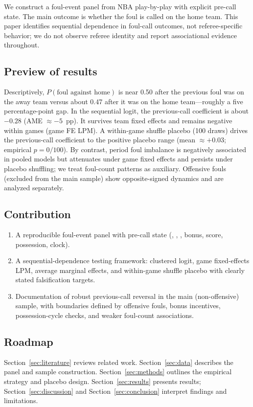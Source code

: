 We construct a foul-event panel from NBA play-by-play with explicit pre-call state. The main outcome is whether the foul is called on the home team. This paper identifies sequential dependence in foul-call outcomes, not referee-specific behavior; we do not observe referee identity and report associational evidence throughout.

\subsection{Preview of results}

Descriptively, $P(\text{foul against home})$ is near 0.50 after the previous foul was on the away team versus about 0.47 after it was on the home team---roughly a five percentage-point gap. In the sequential logit, the previous-call coefficient is about $-0.28$ (AME $\approx -5$~pp). It survives team fixed effects and remains negative within games (game FE LPM). A within-game shuffle placebo (100 draws) drives the previous-call coefficient to the positive placebo range (mean $\approx +0.03$; empirical $p=0/100$). By contrast, period foul imbalance is negatively associated in pooled models but attenuates under game fixed effects and persists under placebo shuffling; we treat foul-count patterns as auxiliary. Offensive fouls (excluded from the main sample) show opposite-signed dynamics and are analyzed separately.

\subsection{Contribution}

\begin{enumerate}
  \item A reproducible foul-event panel with pre-call state (\fouldiff, \perioddiff, \foullast, bonus, score, possession, clock).
  \item A sequential-dependence testing framework: clustered logit, game fixed-effects LPM, average marginal effects, and within-game shuffle placebo with clearly stated falsification targets.
  \item Documentation of robust previous-call reversal in the main (non-offensive) sample, with boundaries defined by offensive fouls, bonus incentives, possession-cycle checks, and weaker foul-count associations.
\end{enumerate}

\subsection{Roadmap}

Section~\ref{sec:literature} reviews related work. Section~\ref{sec:data} describes the panel and sample construction. Section~\ref{sec:methods} outlines the empirical strategy and placebo design. Section~\ref{sec:results} presents results; Section~\ref{sec:discussion} and Section~\ref{sec:conclusion} interpret findings and limitations.
